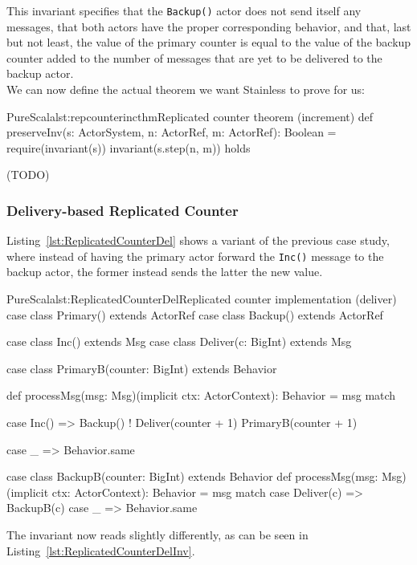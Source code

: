 \documentclass[a4paper,twoside]{article}
\newcommand{\TODO}[1]{\textcolor{YellowOrange}{(TODO)}} %
\newcommand{\RefCode}[1]{Listing~\ref{#1}}
\newcommand{\stt}[1]{\texttt{\small{#1}}}
\begin{document}
This invariant specifies that the \stt{Backup()} actor does not send itself any messages, that both actors have the proper corresponding behavior, and that, last but not least, the value of the primary counter is equal to the value of the backup counter added to the number of messages that are yet to be delivered to the backup actor.\\

We can now define the actual theorem we want Stainless to prove for us:

\begin{Code}{PureScala}{lst:repcounterincthm}{Replicated counter theorem (increment)}
def preserveInv(s: ActorSystem, n: ActorRef, m: ActorRef): Boolean = {
  require(invariant(s))
  invariant(s.step(n, m))
} holds
\end{Code}

\TODO{Rep Counter Inc Result}

\subsubsection{Delivery-based Replicated Counter}

\RefCode{lst:ReplicatedCounterDel} shows a variant of the previous case study, where instead of having the primary actor forward the \stt{Inc()} message to the backup actor, the former instead sends the latter the new value.

\begin{Code}{PureScala}{lst:ReplicatedCounterDel}{Replicated counter implementation (deliver)}
case class Primary() extends ActorRef
case class Backup()  extends ActorRef

case class Inc() extends Msg
case class Deliver(c: BigInt) extends Msg

case class PrimaryB(counter: BigInt) extends Behavior {
  def processMsg(msg: Msg)(implicit ctx: ActorContext): Behavior = msg match {
    case Inc() =>
      Backup() ! Deliver(counter + 1)
      PrimaryB(counter + 1)

    case _ => Behavior.same
  }
}

case class BackupB(counter: BigInt) extends Behavior {
  def processMsg(msg: Msg)(implicit ctx: ActorContext): Behavior = msg match {
    case Deliver(c) => BackupB(c)
    case _          => Behavior.same
  }
}
\end{Code}

The invariant now reads slightly differently, as can be seen in \RefCode{lst:ReplicatedCounterDelInv}.
\end{document}
